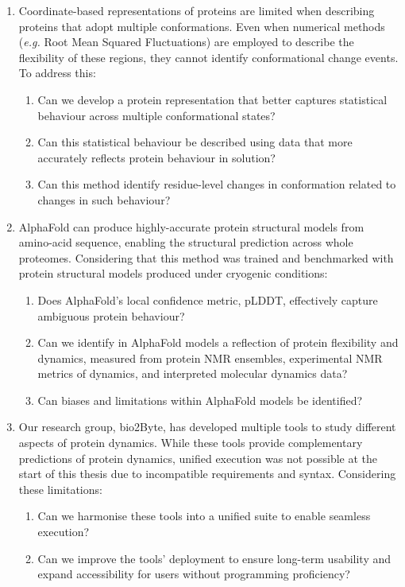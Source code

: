 \begin{enumerate}
    \item Coordinate-based representations of proteins are limited when describing proteins that adopt multiple conformations. Even when numerical methods (\textit{e.g.} Root Mean Squared Fluctuations) are employed to describe the flexibility of these regions, they cannot identify conformational change events. To address this: 
    \begin{enumerate}
        \item Can we develop a protein representation that better captures statistical behaviour across multiple conformational states?
        \item Can this statistical behaviour be described using data that more accurately reflects protein behaviour in solution?
        \item Can this method identify residue-level changes in conformation related to changes in such behaviour?
    \end{enumerate}
    
    \item AlphaFold can produce highly-accurate protein structural models from amino-acid sequence, enabling the structural prediction across whole proteomes. Considering that this method was trained and benchmarked with protein structural models produced under cryogenic conditions: 
    \begin{enumerate}
        \item Does AlphaFold's local confidence metric, pLDDT, effectively capture ambiguous protein behaviour?
        \item Can we identify in AlphaFold models a reflection of protein flexibility and dynamics, measured from protein NMR ensembles, experimental NMR metrics of dynamics, and interpreted molecular dynamics data?
        \item Can biases and limitations within AlphaFold models be identified?
    \end{enumerate}

    \item Our research group, bio2Byte, has developed multiple tools to study different aspects of protein dynamics. While these tools provide complementary predictions of protein dynamics, unified execution was not possible at the start of this thesis due to incompatible requirements and syntax. Considering these limitations: 
    \begin{enumerate}
        \item Can we harmonise these tools into a unified suite to enable seamless execution?
        \item Can we improve the tools' deployment to ensure long-term usability and expand accessibility for users without programming proficiency?
    \end{enumerate}
\end{enumerate}



